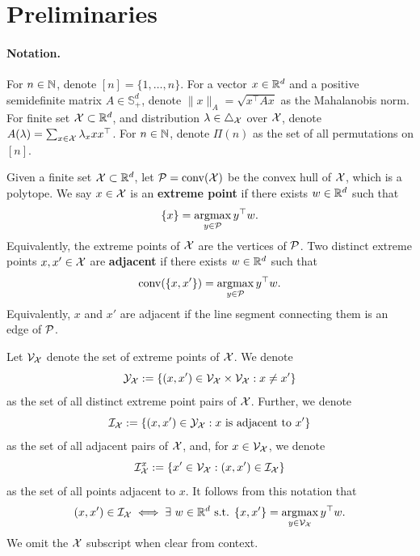 \section{Preliminaries} \label{sec:preliminaries}
\paragraph{Notation.} 
For $n \in \mathbb{N}$, denote $[n] = \{1,\dots,n\}$. For a vector $x \in \mathbb{R}^d$ and a positive semidefinite matrix $A \in \mathbb{S}_{+}^d$, denote $\|x\|_{A} = \sqrt{x^\top Ax}$ as the Mahalanobis norm. For finite set $\mathcal{X} \subset \mathbb{R}^d$, and distribution $\lambda \in \triangle_{\mathcal{X}}$ over $\mathcal{X}$, denote $A(\lambda) = \sum_{x\in\mathcal{X}} \lambda_{x} xx^\top$. For $n \in \mathbb{N}$, denote $\Pi(n)$ as the set of all permutations on $[n]$.
\begin{definition}
    \label{def:adjacency}
    Given a finite set $\mathcal{X}\subset \mathbb{R}^d$, let $\mathcal{P}=\mathrm{conv}(\mathcal{X})$ be the convex hull of $\mathcal{X}$, which is a polytope. We say $x\in\mathcal{X}$ is an \textbf{extreme point} if there exists $w \in \mathbb{R}^d$ such that \begin{equation}   
    \{x\} = \operatorname*{argmax}_{y \in \mathcal{P}} y^\top w.\end{equation} Equivalently, the extreme points of $\mathcal{X}$ are the vertices of $\mathcal{P}$. Two distinct extreme points $x, x'\in\mathcal{X}$ are \textbf{adjacent} if there exists $w \in \mathbb{R}^d$ such that \begin{equation}  \operatorname*{conv}(\{x,x'\}) = \operatorname*{argmax}_{y\in \mathcal{P}} y^\top w.\end{equation} Equivalently, $x$ and $x'$ are adjacent if the line segment connecting them is an edge of $\mathcal{P}$.
\end{definition}
Let $\mathcal{V}_{\mathcal{X}}$ denote the set of extreme points of $\mathcal{X}$. We denote \begin{equation}
    \mathcal{Y}_{\mathcal{X}} := \left\{(x,x') \in \mathcal{V}_{\mathcal{X}} \times \mathcal{V}_{\mathcal{X}}: x\neq x'\right\}
\end{equation} as the set of all distinct extreme point pairs of $\mathcal{X}$. Further, we denote\begin{equation}
    \mathcal{I}_{\mathcal{X}} :=  \left\{(x,x') \in \mathcal{Y}_{\mathcal{X}} :x\text{ is adjacent to }x'\right\}
\end{equation}
 as the set of all adjacent pairs of $\mathcal{X}$, and, for $x\in \mathcal{V}_{\mathcal{X}}$, we denote \begin{equation}
    \mathcal{I}^{x}_{\mathcal{X}}:=\left\{x' \in \mathcal{V}_{\mathcal{X}} : (x,x') \in \mathcal{I}_{\mathcal{X}}
    \right\}
\end{equation} as the set of all points adjacent to $x$. It follows from this notation that \begin{equation}\label{eq:adjacentdef}(x,x') \in \mathcal{I}_{\mathcal{X}} \iff \exists~w \in \mathbb{R}^d \text{ s.t. } \{x,x'\} = \operatorname*{argmax}_{y \in \mathcal{V}_{\mathcal{X}}} y^\top w.\end{equation}
We omit the $\mathcal{X}$ subscript when clear from context.


